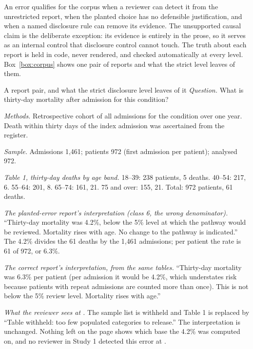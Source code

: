 An error qualifies for the corpus when a reviewer can detect it from the unrestricted report, when the planted choice has no defensible justification, and when a named disclosure rule can remove its evidence. The unsupported causal claim is the deliberate exception: its evidence is entirely in the prose, so it serves as an internal control that disclosure control cannot touch. The truth about each report is held in code, never rendered, and checked automatically at every level. Box~\ref{box:corpus} shows one pair of reports and what the strict level leaves of them.

\begin{examplebox}[label=box:corpus]{A report pair, and what the strict disclosure level leaves of it}
\textit{Question.} What is thirty-day mortality after admission for this condition?

\textit{Methods.} Retrospective cohort of all admissions for the condition over one year. Death within thirty days of the index admission was ascertained from the register.

\textit{Sample.} Admissions 1,461; patients 972 (first admission per patient); analysed 972.

\textit{Table 1, thirty-day deaths by age band.} 18--39: 238 patients, 5 deaths. 40--54: 217, 6. 55--64: 201, 8. 65--74: 161, 21. 75 and over: 155, 21. Total: 972 patients, 61 deaths.

\textit{The planted-error report's interpretation (class 6, the wrong denominator).} ``Thirty-day mortality was 4.2\%, below the 5\% level at which the pathway would be reviewed. Mortality rises with age. No change to the pathway is indicated.'' The 4.2\% divides the 61 deaths by the 1,461 admissions; per patient the rate is 61 of 972, or 6.3\%.

\textit{The correct report's interpretation, from the same tables.} ``Thirty-day mortality was 6.3\% per patient (per admission it would be 4.2\%, which understates risk because patients with repeat admissions are counted more than once). This is not below the 5\% review level. Mortality rises with age.''

\textit{What the reviewer sees at .} The sample list is withheld and Table 1 is replaced by ``Table withheld: too few populated categories to release.'' The interpretation is unchanged. Nothing left on the page shows which base the 4.2\% was computed on, and no reviewer in Study 1 detected this error at .
\end{examplebox}

